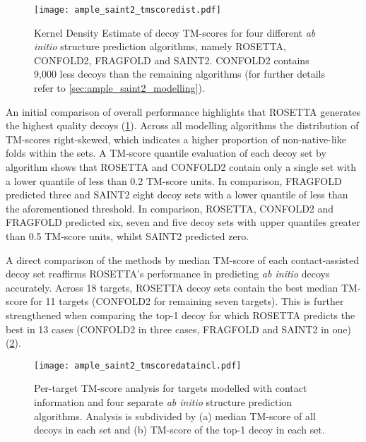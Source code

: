 \begin{figure}[H]
    \centering
    \texttt{[image: ample\_saint2\_tmscoredist.pdf]}
    \caption[Distribution of decoy TM-scores for four modelling algorithms]{Kernel Density Estimate of decoy TM-scores for four different \textit{ab initio} structure prediction algorithms, namely ROSETTA, CONFOLD2, FRAGFOLD and SAINT2. CONFOLD2 contains 9,000 less decoys than the remaining algorithms (for further details refer to \cref{sec:ample_saint2_modelling}).}
    \label{fig:ample_saint2_tmscoredist}
\end{figure}

An initial comparison of overall performance highlights that ROSETTA generates the highest quality decoys (\cref{fig:ample_saint2_tmscoredist}). Across all modelling algorithms the distribution of TM-scores right-skewed, which indicates a higher proportion of non-native-like folds within the sets. A TM-score quantile evaluation of each decoy set by algorithm shows that ROSETTA and CONFOLD2 contain only a single set with a lower quantile of less than 0.2 TM-score units. In comparison, FRAGFOLD predicted three and SAINT2 eight decoy sets with a lower quantile of less than the aforementioned threshold. In comparison, ROSETTA, CONFOLD2 and FRAGFOLD predicted six, seven and five decoy sets with upper quantiles greater than 0.5 TM-score units, whilst SAINT2 predicted zero. 

A direct comparison of the methods by median TM-score of each contact-assisted decoy set reaffirms ROSETTA's performance in predicting \textit{ab initio} decoys accurately. Across 18 targets, ROSETTA decoy sets contain the best median TM-score for 11 targets (CONFOLD2 for remaining seven targets). This is further strengthened when comparing the top-1 decoy for which ROSETTA predicts the best in 13 cases (CONFOLD2 in three cases, FRAGFOLD and SAINT2 in one) (\cref{fig:ample_saint2_tmscoredataincl}).

\begin{figure}[H]
    \centering
    \texttt{[image: ample\_saint2\_tmscoredataincl.pdf]}
    \caption[Per-target TM-score analysis for four modelling algorithms with contacts]{Per-target TM-score analysis for targets modelled with contact information and four separate \textit{ab initio} structure prediction algorithms. Analysis is subdivided by (a) median TM-score of all decoys in each set and (b) TM-score of the top-1 decoy in each set.}
    \label{fig:ample_saint2_tmscoredataincl}
\end{figure}

